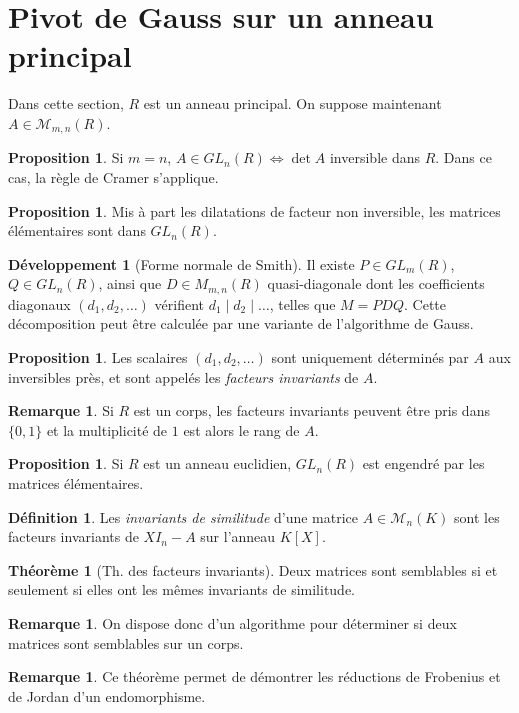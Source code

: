 \documentclass[11pt,a4paper,twocolumn]{article}
\theoremstyle{definition}
\newtheorem{definition}[equation]{Définition}
\newtheorem{proposition}[equation]{Proposition}
\newtheorem{theorem}[equation]{Théorème}
\newtheorem{remark}[equation]{Remarque}
\newcounter{n}
\newtheorem{dev}[n]{Développement}
\def\M{\mathcal{M}}
\begin{document}
\section{Pivot de Gauss sur un anneau principal}

Dans cette section, $R$ est un anneau principal. On suppose maintenant $A \in
\M_{m,n}(R)$.

\begin{proposition}
  Si $m = n$, $A \in GL_n(R) \Leftrightarrow \det A$ inversible dans $R$. Dans
  ce cas, la règle de Cramer s'applique.
\end{proposition}

\begin{proposition}
  Mis à part les dilatations de facteur non inversible, les matrices
  élémentaires sont dans $GL_n(R)$.
\end{proposition}

\begin{dev}[Forme normale de Smith]
  Il existe $P \in GL_m(R)$, $Q \in GL_n(R)$, ainsi que $D \in M_{m,n}(R)$
  quasi-diagonale dont les coefficients diagonaux $(d_1, d_2, \ldots)$ vérifient
  $d_1 \mid d_2 \mid \ldots$, telles que $M = PDQ$. Cette décomposition peut
  être calculée par une variante de l'algorithme de Gauss.
\end{dev}
\begin{proposition}
  Les scalaires $(d_1, d_2, \ldots)$ sont uniquement déterminés par $A$ aux
  inversibles près, et sont appelés les \emph{facteurs invariants} de $A$.
\end{proposition}
\begin{remark}
  Si $R$ est un corps, les facteurs invariants peuvent être pris dans $\{0,1\}$
  et la multiplicité de $1$ est alors le rang de $A$.
\end{remark}

\begin{proposition}
  Si $R$ est un anneau euclidien, $GL_n(R)$ est engendré par les matrices
  élémentaires.
\end{proposition}

\begin{definition}
  Les \emph{invariants de similitude} d'une matrice $A \in \M_n(K)$ sont les
  facteurs invariants de $XI_n - A$ sur l'anneau $K[X]$.
\end{definition}

\begin{theorem}[Th. des facteurs invariants]
  Deux matrices sont semblables si et seulement si elles ont les mêmes
  invariants de similitude.
\end{theorem}
\begin{remark}
  On dispose donc d'un algorithme pour déterminer si deux matrices sont
  semblables sur un corps.
\end{remark}
\begin{remark}
  Ce théorème permet de démontrer les réductions de Frobenius et de Jordan d'un
  endomorphisme.
\end{remark}
\end{document}
